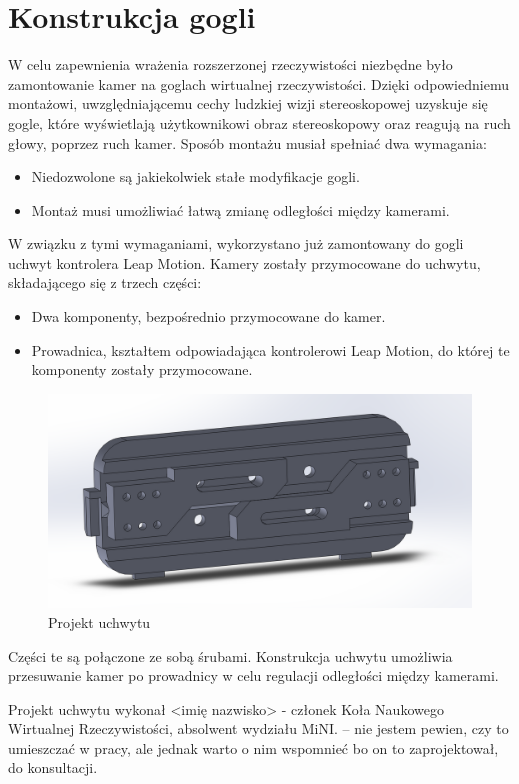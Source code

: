\documentclass[a4paper,11pt,twoside]{report}
\theoremstyle{definition}
\begin{document}
\section{Konstrukcja gogli}
W celu zapewnienia wrażenia rozszerzonej rzeczywistości niezbędne było zamontowanie kamer na goglach wirtualnej rzeczywistości. Dzięki odpowiedniemu montażowi, uwzględniającemu cechy ludzkiej wizji stereoskopowej uzyskuje się gogle, które wyświetlają użytkownikowi obraz stereoskopowy oraz reagują na ruch głowy, poprzez ruch kamer.
Sposób montażu musiał spełniać dwa wymagania:
\begin{itemize}
\item Niedozwolone są jakiekolwiek stałe modyfikacje gogli.
\item Montaż musi umożliwiać łatwą zmianę odległości między kamerami.
\end{itemize}
W związku z tymi wymaganiami, wykorzystano już zamontowany do gogli uchwyt kontrolera Leap Motion. Kamery zostały przymocowane do uchwytu, składającego się z trzech części:
\begin{itemize}
\item Dwa komponenty, bezpośrednio przymocowane do kamer.
\item Prowadnica, kształtem odpowiadająca kontrolerowi Leap Motion, do której te komponenty zostały przymocowane.
\end{itemize}

\begin{figure}[H]
\centering
\includegraphics[scale=0.3]{images/cameraHolder}
\caption[Projekt uchwytu]{Projekt uchwytu}
\end{figure}

Części te są połączone ze sobą śrubami. Konstrukcja uchwytu umożliwia przesuwanie kamer po prowadnicy w celu regulacji odległości między kamerami.

Projekt uchwytu wykonał <imię nazwisko> - członek Koła Naukowego Wirtualnej Rzeczywistości, absolwent wydziału MiNI. -- nie jestem pewien, czy to umieszczać w pracy, ale jednak warto o nim wspomnieć bo on to zaprojektował, do konsultacji.
\end{document}
